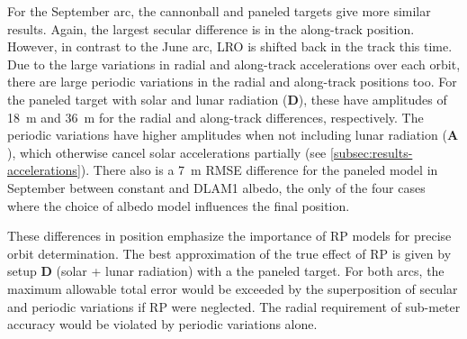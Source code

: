 For the September arc, the cannonball and paneled targets give more similar results. Again, the largest secular difference is in the along-track position. However, in contrast to the June arc, \gls{LRO} is shifted back in the track this time. Due to the large variations in radial and along-track accelerations over each orbit, there are large periodic variations in the radial and along-track positions too. For the paneled target with solar and lunar radiation ($\mathbf{D}$), these have amplitudes of \qty{18}{\m} and \qty{36}{\m} for the radial and along-track differences, respectively. The periodic variations have higher amplitudes when not including lunar radiation ($\mathbf{A}$), which otherwise cancel solar accelerations partially (see \cref{subsec:results-accelerations}). There also is a \qty{7}{m} RMSE difference for the paneled model in September between constant and \gls{DLAM1} albedo, the only of the four cases where the choice of albedo model influences the final position.


These differences in position emphasize the importance of \gls{RP} models for precise orbit determination. The best approximation of the true effect of \gls{RP} is given by setup $\mathbf{D}$ (solar + lunar radiation) with a the paneled target. For both arcs, the maximum allowable total error would be exceeded by the superposition of secular and periodic variations if \gls{RP} were neglected. The radial requirement of sub-meter accuracy would be violated by periodic variations alone.






    
%             
    
